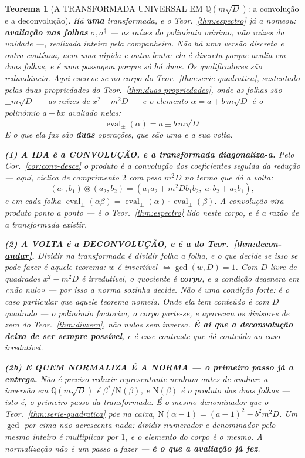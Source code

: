 \documentclass[11pt,a4paper]{article}
\newtheorem{teorema}{Teorema}
\newcommand{\dg}{^{\dagger}}
\begin{document}
\begin{teorema}[A TRANSFORMADA UNIVERSAL EM $\mathbb{Q}(m\sqrt D)$: a convolução e a
deconvolução]\label{thm:transformada-universal}
Há \textbf{uma} transformada, e o Teor.~\ref{thm:espectro} já a nomeou: \textbf{avaliação
nas folhas} $\sigma,\sigma\dg$ --- as raízes do polinómio mínimo, \emph{não} raízes da
unidade ---, realizada inteira pela companheira. Não há uma versão discreta e outra
contínua, nem uma rápida e outra lenta: \emph{ela é discreta porque avalia em duas folhas,
e é uma passagem porque só há duas}. Os qualificadores são redundância. Aqui escreve-se no
corpo do Teor.~\ref{thm:serie-quadratica}, sustentado pelas duas propriedades do
Teor.~\ref{thm:duas-propriedades}, onde as folhas são $\pm m\sqrt D$ --- as raízes
de $x^{2}-m^{2}D$ --- e o elemento $\alpha=a+b\,m\sqrt D$ é o polinómio $a+bx$ avaliado
nelas:
\[
\boxed{\;\operatorname{eval}_{\pm}(\alpha)=a\pm b\,m\sqrt D\;}
\]
E o que ela faz são \textbf{duas} operações, que são uma e a sua volta.

\textbf{(1) A IDA é a CONVOLUÇÃO, e a transformada diagonaliza-a.} Pelo
Cor.~\ref{cor:conv-desce} o produto é a convolução dos coeficientes seguida da redução ---
aqui, cíclica de comprimento $2$ com peso $m^{2}D$ no termo que dá a volta:
\[
(a_1,b_1)\circledast(a_2,b_2)=(a_1a_2+m^{2}Db_1b_2,\;a_1b_2+a_2b_1),
\]
e em cada folha
$\operatorname{eval}_\pm(\alpha\beta)=\operatorname{eval}_\pm(\alpha)\cdot
\operatorname{eval}_\pm(\beta)$. \emph{A convolução vira produto ponto a ponto} --- é o
Teor.~\ref{thm:espectro} lido neste corpo, e é a razão de a transformada existir.

\textbf{(2) A VOLTA é a DECONVOLUÇÃO, e é a do Teor.~\ref{thm:decon-andar}.} Dividir na
transformada é dividir folha a folha, e o que decide se isso se pode fazer é aquele
teorema: $w$ é invertível $\iff\gcd(w,D)=1$. Com $D$ livre de quadrados $x^{2}-m^{2}D$ é
irredutível, o quociente é \textbf{corpo}, e a condição \emph{degenera} em «não nulo» ---
por isso a norma sozinha decide. \emph{Não é uma condição forte: é o caso particular que
aquele teorema nomeia.} Onde ela tem conteúdo é com $D$ quadrado --- o polinómio factoriza,
o corpo parte-se, e aparecem os divisores de zero do Teor.~\ref{thm:divzero}, não nulos sem
inversa. \textbf{É aí que a deconvolução deixa de ser sempre possível}, e é esse contraste
que dá conteúdo ao caso irredutível.

\textbf{(2b) E QUEM NORMALIZA É A NORMA --- o primeiro passo já a entrega.} Não é preciso
reduzir representante nenhum antes de avaliar: a inversão em $\mathbb{Q}(m\sqrt D)$ é
$\beta^{\ast}/\mathrm{N}(\beta)$, e $\mathrm{N}(\beta)$ \emph{é o produto das duas folhas}
--- isto é, o primeiro passo da transformada. É o mesmo denominador que o
Teor.~\ref{thm:serie-quadratica} põe na caixa, $\mathrm{N}(\alpha-1)=(a-1)^{2}-b^{2}m^{2}D$.
\emph{Um $\gcd$ por cima não acrescenta nada}: dividir numerador e denominador pelo mesmo
inteiro é multiplicar por $1$, e o elemento do corpo é o mesmo. A normalização não é um
passo a fazer --- \textbf{é o que a avaliação já fez}.


\end{teorema}
\end{document}
